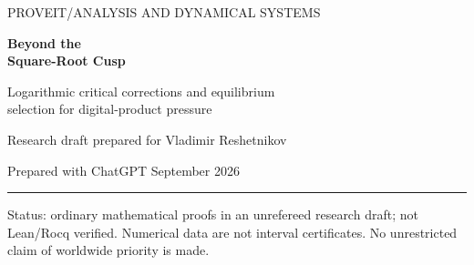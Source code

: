 \documentclass[11pt,a4paper]{article}
\numberwithin{equation}{section}
\theoremstyle{definition}
\theoremstyle{remark}
\newcommand{\Leb}{\mathfrak m}
\begin{document}
\hypersetup{pageanchor=false}
\begin{titlepage}
\thispagestyle{empty}
\setlength{\parindent}{0pt}
{\small\sffamily\color{ink} PROVEIT\quad /\quad ANALYSIS AND DYNAMICAL SYSTEMS}\par
\vspace{15mm}
{\Huge\bfseries\color{ink} Beyond the\\[3mm] Square-Root Cusp\par}
\vspace{7mm}
{\Large Logarithmic critical corrections and equilibrium\\[2mm]
selection for digital-product pressure\par}
\vspace{9mm}
{\large Research draft prepared for Vladimir Reshetnikov\par}
{Prepared with ChatGPT\quad\textbullet{} September 2026\par}
\vspace{7mm}\hrule\vspace{3mm}
\begin{abstract}
The ProveIt critical-pressure article determines a square-root singularity
and explicitly asks for its next term and for the limiting equilibrium
measures. We address both questions. For the consecutive digital mask in
any integer base $b\ge2$, put $\kappa_b=\sqrt{2(b-1)\log b}$. At the
critical absolute-moment exponent, the unnormalized cylinder pressure is
\[
\begin{split}
 P_{b,1}(c)={}&\kappa_b\sqrt{|c|}-(b-1)|c|\log(1/|c|)\\
 &+\bigl[b\log b+(b-1)(\gamma-1)\bigr]|c|
 +O_{b,\eta}(|c|^{3/2-\eta})
\end{split}
\]
for every $0<\eta<1/2$. Thus both a logarithmic term and an ordinary
linear term occur. The logarithm comes from an explicitly evaluated
finite-part response functional, rather than from a formal continuation
of a supercritical zeta coefficient.

At nonzero phases near zero there is a unique equilibrium probability.
At the critical exponent it converges weakly to
$\tfrac12\delta_0+\tfrac12\Leb$, where $\Leb$ is normalized Lebesgue
measure. More generally, along $s=1+u\sqrt{|c|}$, bounded detuning selects
an explicit mixture whose atomic mass is
\[
 \frac12\left(1+
 \frac{u\log b}{\sqrt{u^2(\log b)^2+8(b-1)\log b}}\right).
\]
We obtain the individual left and right eigenvector asymptotics, a
$\sqrt{|c|}$-scale boundary layer, and the exact leading divergence of a
finite-product amplitude. The spectral foundation and the leading
crossover are credited to the repository predecessor and reconstructed
as needed. Detailed proofs, reproducible diagnostics, a claims audit,
and further research questions accompany the article.
\end{abstract}
\vfill
{\small\color{muted} Status: ordinary mathematical proofs in an unrefereed research draft;
not Lean/Rocq verified. Numerical data are not interval certificates.
No unrestricted claim of worldwide priority is made.}
\end{titlepage}
\hypersetup{pageanchor=true}
\begingroup\small\setlength{\parskip}{0pt}\tableofcontents\endgroup
\newpage
\end{document}
